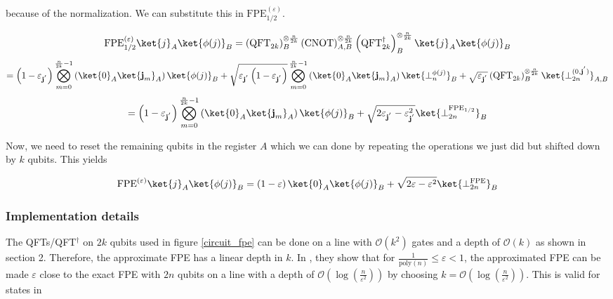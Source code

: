 because of the normalization. We can substitute this in $\text{FPE}^{(\varepsilon)}_{1/2}$. 

\begin{equation*}
     \text{FPE}^{(\varepsilon)}_{1/2}\ket{j}_A\ket{\phi(j)}_B = \left(\text{QFT}_{2k}\right)_B^{\otimes \frac{n}{2k}}\left(\text{CNOT}\right)_{A,B}^{\otimes \frac{n}{2k}}\left(\text{QFT}^{\dagger}_{2k}\right)_B^{\otimes \frac{n}{2k}} \ket{j}_A\ket{\phi(j)}_B
\end{equation*}
\begin{equation*}
    = \left(1 - \varepsilon_{\textbf{j}^{'}}\right)\bigotimes_{m=0}^{\frac{n}{2k}-1}\left(\ket{0}_A\ket{\textbf{j}_m}_A\right)\ket{\phi(j)}_B + \sqrt{\varepsilon_{\textbf{j}^{'}}\left(1 - \varepsilon_{\textbf{j}^{'}}\right)}\bigotimes_{m=0}^{\frac{n}{2k}-1}\left(\ket{0}_A\ket{\textbf{j}_m}_A\right)\ket{\perp_n^{\phi(j)}}_B + \sqrt{\varepsilon_{\textbf{j}^{'}}}\left(\text{QFT}_{2k}\right)_B^{\otimes \frac{n}{2k}}\ket{\perp_{2n}^{(0, \textbf{j}^{'})}}_{A,B}
\end{equation*}
\begin{equation*}
    = \left(1 - \varepsilon_{\textbf{j}^{'}}\right)\bigotimes_{m=0}^{\frac{n}{2k}-1}\left(\ket{0}_A\ket{\textbf{j}_m}_A\right)\ket{\phi(j)}_B + \sqrt{2\varepsilon_{\textbf{j}^{'}} - \varepsilon_{\textbf{j}^{'}}^2}\ket{\perp_{2n}^{\text{FPE}_{1/2}}}_B
    \label{state_fpe_after_first_layer}
\end{equation*}

Now, we need to reset the remaining qubits in the register $A$ which we can done by repeating the operations we just did but shifted down by $k$ qubits. This yields

\begin{equation}
    \text{FPE}^{(\varepsilon)}\ket{j}_A\ket{\phi(j)}_B = \left(1-\varepsilon\right)\ket{0}_A\ket{\phi(j)}_B + \sqrt{2\varepsilon - \varepsilon^2}\ket{\perp_{2n}^{\text{FPE}}}_B
    \label{final_state_fpe}
\end{equation}

\subsubsection{Implementation details}
The QFTs/QFT$^{\dagger}$ on $2k$ qubits used in figure \ref{circuit_fpe} can be done on a line with $\mathcal{O}(k^2)$ gates and a depth of $\mathcal{O}(k)$ as shown in section 2. Therefore, the approximate FPE has a linear depth in $k$. In \cite{bäumer2025approximatequantumfouriertransform}, they show that for $\frac{1}{\text{poly}(n)} \leq \varepsilon < 1$, the approximated FPE can be made  $\varepsilon$ close to the exact FPE with $2n$ qubits on a line with a depth of $\mathcal{O}(\log\left(\frac{n}{\varepsilon^2}\right))$ by choosing $k = \mathcal{O}(\log\left(\frac{n}{\varepsilon^2}\right))$. This is valid for states in

